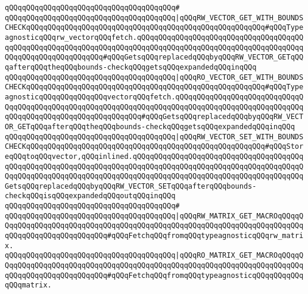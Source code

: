\verb|qQQqqQQqqQQqqQQqqQQqqQQqqQQqqQQqqQQqqQQq#|\newline
\verb|qQQqqQQqqQQqqQQqqQQqqQQqqQQqqQQqqQQqqQQq|\verb#|qQQqRW_VECTOR_GET_WITH_BOUNDSCHECKqQQqqQQqqQQqqQQqqQQqqQQqqQQqqQQqqQQqqQQqqQQqqQQqqQQqqQQq#\verb|#qQQqTypeagnosticqQQqrw_vectorqQQqfetch.qQQqqQQqqQQqqQQqqQQqqQQqqQQqqQQqqQQqqQQqqQQqqQQqqQQqqQQqqQQqqQQqqQQqqQQqqQQqqQQqqQQqqQQqqQQqqQQqqQQqqQQqqQQqqQQqqQQqqQQqqQQqqQQqqQQq#qQQqGetsqQQqreplacedqQQqbyqQQqRW_VECTOR_GETqQQqafterqQQqtheqQQqbounds-checkqQQqgetsqQQqexpandedqQQqinqQQq|\newline
\verb|qQQqqQQqqQQqqQQqqQQqqQQqqQQqqQQqqQQqqQQq|\verb#|qQQqRO_VECTOR_GET_WITH_BOUNDSCHECKqQQqqQQqqQQqqQQqqQQqqQQqqQQqqQQqqQQqqQQqqQQqqQQqqQQqqQQq#\verb|#qQQqTypeagnosticqQQqqQQqqQQqqQQqvectorqQQqfetch.qQQqqQQqqQQqqQQqqQQqqQQqqQQqqQQqqQQqqQQqqQQqqQQqqQQqqQQqqQQqqQQqqQQqqQQqqQQqqQQqqQQqqQQqqQQqqQQqqQQqqQQqqQQqqQQqqQQqqQQqqQQqqQQqqQQq#qQQqGetsqQQqreplacedqQQqbyqQQqRW_VECTOR_GETqQQqafterqQQqtheqQQqbounds-checkqQQqgetsqQQqexpandedqQQqinqQQq|\newline
\verb|qQQqqQQqqQQqqQQqqQQqqQQqqQQqqQQqqQQqqQQq|\verb#|qQQqRW_VECTOR_SET_WITH_BOUNDSCHECKqQQqqQQqqQQqqQQqqQQqqQQqqQQqqQQqqQQqqQQqqQQqqQQqqQQqqQQq#\verb|#qQQqStoreqQQqtoqQQqvector,qQQqinlined.qQQqqQQqqQQqqQQqqQQqqQQqqQQqqQQqqQQqqQQqqQQqqQQqqQQqqQQqqQQqqQQqqQQqqQQqqQQqqQQqqQQqqQQqqQQqqQQqqQQqqQQqqQQqqQQqqQQqqQQqqQQqqQQqqQQqqQQqqQQqqQQqqQQqqQQqqQQqqQQqqQQqqQQqqQQqqQQqqQQqGetsqQQqreplacedqQQqbyqQQqRW_VECTOR_SETqQQqafterqQQqbounds-checkqQQqisqQQqexpandedqQQqoutqQQqinqQQq|\newline
\verb|qQQqqQQqqQQqqQQqqQQqqQQqqQQqqQQqqQQqqQQq#|\newline
\verb|qQQqqQQqqQQqqQQqqQQqqQQqqQQqqQQqqQQqqQQq|\verb#|qQQqRW_MATRIX_GET_MACROqQQqqQQqqQQqqQQqqQQqqQQqqQQqqQQqqQQqqQQqqQQqqQQqqQQqqQQqqQQqqQQqqQQqqQQqqQQqqQQqqQQqqQQqqQQqqQQqqQQq#\verb|#qQQqFetchqQQqfromqQQqtypeagnosticqQQqrw_matrix.|\newline
\verb|qQQqqQQqqQQqqQQqqQQqqQQqqQQqqQQqqQQqqQQq|\verb#|qQQqRO_MATRIX_GET_MACROqQQqqQQqqQQqqQQqqQQqqQQqqQQqqQQqqQQqqQQqqQQqqQQqqQQqqQQqqQQqqQQqqQQqqQQqqQQqqQQqqQQqqQQqqQQqqQQqqQQq#\verb|#qQQqFetchqQQqfromqQQqtypeagnosticqQQqqQQqqQQqqQQqmatrix.|\newline
